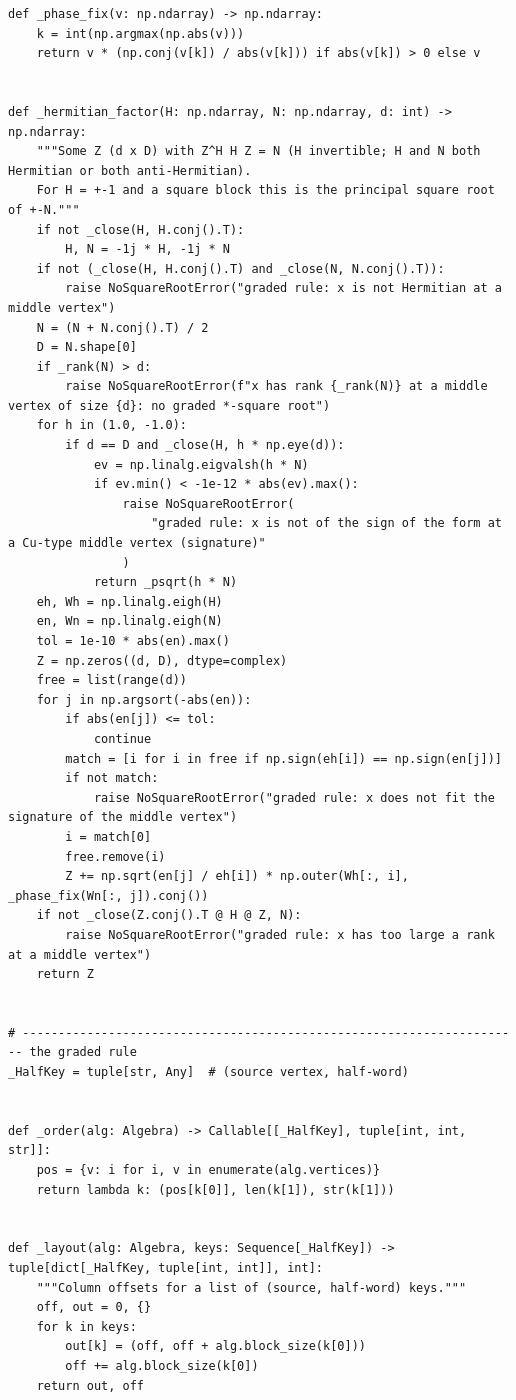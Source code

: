 \documentclass[12pt, a4paper]{report}
\theoremstyle{plain}
\theoremstyle{definition}
\theoremstyle{remark}
\theoremstyle{plain}
\begin{document}
\begin{lstlisting}[style=dsqcode]
def _phase_fix(v: np.ndarray) -> np.ndarray:
    k = int(np.argmax(np.abs(v)))
    return v * (np.conj(v[k]) / abs(v[k])) if abs(v[k]) > 0 else v


def _hermitian_factor(H: np.ndarray, N: np.ndarray, d: int) -> np.ndarray:
    """Some Z (d x D) with Z^H H Z = N (H invertible; H and N both Hermitian or both anti-Hermitian).
    For H = +-1 and a square block this is the principal square root of +-N."""
    if not _close(H, H.conj().T):
        H, N = -1j * H, -1j * N
    if not (_close(H, H.conj().T) and _close(N, N.conj().T)):
        raise NoSquareRootError("graded rule: x is not Hermitian at a middle vertex")
    N = (N + N.conj().T) / 2
    D = N.shape[0]
    if _rank(N) > d:
        raise NoSquareRootError(f"x has rank {_rank(N)} at a middle vertex of size {d}: no graded *-square root")
    for h in (1.0, -1.0):
        if d == D and _close(H, h * np.eye(d)):
            ev = np.linalg.eigvalsh(h * N)
            if ev.min() < -1e-12 * abs(ev).max():
                raise NoSquareRootError(
                    "graded rule: x is not of the sign of the form at a Cu-type middle vertex (signature)"
                )
            return _psqrt(h * N)
    eh, Wh = np.linalg.eigh(H)
    en, Wn = np.linalg.eigh(N)
    tol = 1e-10 * abs(en).max()
    Z = np.zeros((d, D), dtype=complex)
    free = list(range(d))
    for j in np.argsort(-abs(en)):
        if abs(en[j]) <= tol:
            continue
        match = [i for i in free if np.sign(eh[i]) == np.sign(en[j])]
        if not match:
            raise NoSquareRootError("graded rule: x does not fit the signature of the middle vertex")
        i = match[0]
        free.remove(i)
        Z += np.sqrt(en[j] / eh[i]) * np.outer(Wh[:, i], _phase_fix(Wn[:, j]).conj())
    if not _close(Z.conj().T @ H @ Z, N):
        raise NoSquareRootError("graded rule: x has too large a rank at a middle vertex")
    return Z


# ---------------------------------------------------------------------- the graded rule
_HalfKey = tuple[str, Any]  # (source vertex, half-word)


def _order(alg: Algebra) -> Callable[[_HalfKey], tuple[int, int, str]]:
    pos = {v: i for i, v in enumerate(alg.vertices)}
    return lambda k: (pos[k[0]], len(k[1]), str(k[1]))


def _layout(alg: Algebra, keys: Sequence[_HalfKey]) -> tuple[dict[_HalfKey, tuple[int, int]], int]:
    """Column offsets for a list of (source, half-word) keys."""
    off, out = 0, {}
    for k in keys:
        out[k] = (off, off + alg.block_size(k[0]))
        off += alg.block_size(k[0])
    return out, off



\end{lstlisting}
\end{document}
